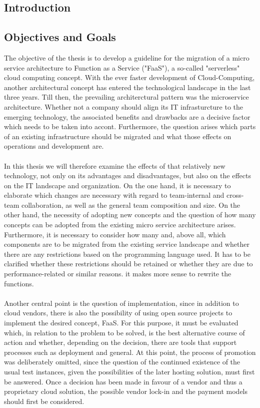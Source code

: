 \documentclass[a4paper,twoside,11pt, pagesize]{scrartcl}
\begin{document}
\begin{spacing}{1.2}
\section{Introduction}


\subsection{Objectives and Goals}
The objective of the thesis is to develop a guideline for the migration of a micro service architecture to Function as a Service ("FaaS"), a so-called "serverless" cloud computing concept. With the ever faster development of Cloud-Computing, another architectural concept has entered the technological landscape in the last three years. Till then, the prevailing architerctural pattern was the microservice architecture. Whether not a company should align its IT infrasturcture to the emerging technology, the associated benefits and drawbacks are a decisive factor which needs to be taken into accont. Furthermore, the question arises which parts of an existing infrastructure should be migrated and what those effects on operations and development are.\\\\
In this thesis we will therefore examine the effects of that relatively new technology, not only on its advantages and disadvantages, but also on the effects on the IT landscape and organization. On the one hand, it is necessary to elaborate which changes are necessary with regard to team-internal and cross-team collaboration, as well as the general team composition and size. On the other hand, the necessity of adopting new concepts and the question of how many concepts can be adopted from the existing micro service architecture arises. Furthermore, it is necessary to consider how many and, above all, which components are to be migrated from the existing service landscape and whether there are any restrictions based on the programming language used. It has to be clarified whether these restrictions should be retained or whether they are due to performance-related or similar reasons. it makes more sense to rewrite the functions.\\\\Another central point is the question of implementation, since in addition to cloud vendors, there is also the possibility of using open source projects to implement the desired concept, FaaS. For this purpose, it must be evaluated which, in relation to the problem to be solved, is the best alternative course of action and whether, depending on the decision, there are tools that support processes such as deployment and general. At this point, the process of promotion was deliberately omitted, since the question of the continued existence of the usual test instances, given the possibilities of the later hosting solution, must first be answered. Once a decision has been made in favour of a vendor and thus a proprietary cloud solution, the possible vendor lock-in and the payment models should first be considered. \\\\

\end{spacing}
\end{document}
